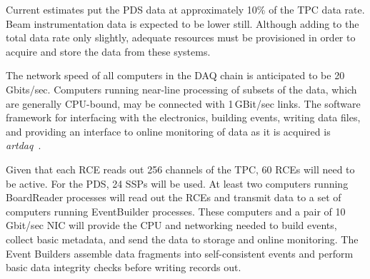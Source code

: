 Current estimates put the PDS data at approximately 10\% 
of the TPC data rate.  Beam instrumentation data is expected to be lower still.
Although adding to the
total data rate only slightly, adequate resources must
be provisioned in order to acquire and store the data from these
systems.  

The network speed of all computers in the DAQ
chain is anticipated to be 20\,Gbits/sec. 
 Computers running near-line
processing of subsets of the data, which are generally CPU-bound, may
be connected with 1\,GBit/sec links.  The software framework for
interfacing with the electronics, building events, writing data files,
and providing an interface to online monitoring of data as it is
acquired is {\it artdaq}~\cite{artdaq}.


Given that each RCE reads out 256 channels of the TPC, 60 RCEs
will need to be active.  For the PDS, 24 SSPs will be used.  At least two computers 
running BoardReader processes will read out
the RCEs and transmit data to a set of computers running EventBuilder processes.
These computers and a
pair of 10\,Gbit/sec NIC will provide the CPU and networking needed to
build events, collect basic metadata, and send the data to storage and
online monitoring.  
The Event Builders assemble data fragments into self-consistent events and perform basic data integrity checks before writing records out.

